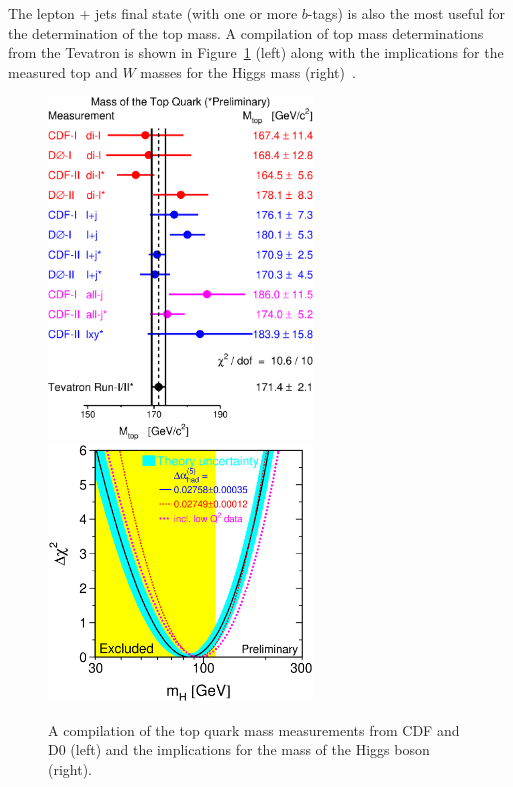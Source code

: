 \documentclass[12pt]{iopart}
\begin{document}
The lepton + jets final state (with one or more $b$-tags) is also the most useful for the determination of the top
mass. A compilation of top mass determinations from the Tevatron is shown in Figure~\ref{fig:topmass} (left) along
with the implications for the measured top and $W$ masses for the Higgs mass (right)~\cite{tevtopmass}. 
%
\begin{figure}[t]
\begin{center}
\includegraphics[width=7cm]{mtop0607.eps}
\includegraphics[width=7cm]{s06_blueband.eps}
\end{center}
\caption{A compilation of the top quark mass measurements from CDF and D0 (left) and the implications for the mass of the Higgs boson (right). } 
\label{fig:topmass}
\end{figure}
%
\end{document}
